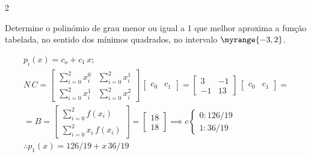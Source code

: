 \documentclass["CN_A-Exercises_Resolutions.tex"]{subfiles}
\begin{document}
\begin{questionBox}2{} %

  Determine o polinómio de grau menor ou igual a 1 que melhor aproxima a função tabelada, no sentido dos mínimos quadrados, no intervalo \(\myrange{-3,2}\).

  \answer{}

  \begin{gather*}
    p_i(x)= c_o+c_1\,x
    ; \\[1ex]
    N\,C
    = \begin{bmatrix}
      \sum_{i=0}^{2}{x_i^0}
      &  \sum_{i=0}^{2}{x_i^1}
      \\ \sum_{i=0}^{2}{x_i^1}
      &  \sum_{i=0}^{2}{x_i^2}
    \end{bmatrix}
    \,\begin{bmatrix}
      c_0 & c_1
    \end{bmatrix}
    = \begin{bmatrix}
      3
      &  -1
      \\ -1
      &  13
    \end{bmatrix}
    \,\begin{bmatrix}
      c_0 & c_1
    \end{bmatrix}
    = \\[1ex]
    = B
    = \begin{bmatrix}
      \sum_{i=0}^{2}{f(x_i)}
      \\ \sum_{i=0}^{2}{x_i\,f(x_i)}
    \end{bmatrix}
    = \begin{bmatrix}
      18 \\ 18
    \end{bmatrix}
    \implies
    c\begin{cases}
      0: 126/19
      \\ 1:36/19
    \end{cases}
    \\[1ex]
    \therefore
    p_1(x)
    = 126/19 + x\,36/19
  \end{gather*}

\end{questionBox}
\end{document}
